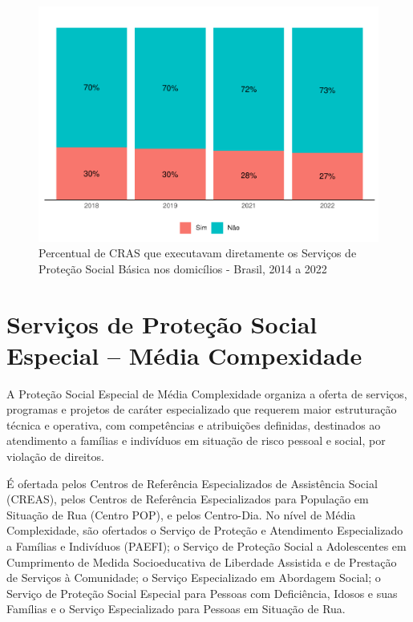 \documentclass[
  brazilian]{report}
\begin{document}
\begin{figure}
\includegraphics{Censo-SUAS-2022_files/figure-latex/CRAS-PSB-1} \caption[Percentual de CRAS que executavam diretamente os Serviços de Proteção Social Básica nos domicílios - Brasil, 2014 a 2022]{Percentual de CRAS que executavam diretamente os Serviços de Proteção Social Básica nos domicílios - Brasil, 2014 a 2022}\label{fig:CRAS-PSB}
\end{figure}

\hypertarget{serviuxe7os-de-proteuxe7uxe3o-social-especial-muxe9dia-compexidade}{%
\section{Serviços de Proteção Social Especial -- Média
Compexidade}\label{serviuxe7os-de-proteuxe7uxe3o-social-especial-muxe9dia-compexidade}}

A Proteção Social Especial de Média Complexidade organiza a oferta de
serviços, programas e projetos de caráter especializado que requerem
maior estruturação técnica e operativa, com competências e atribuições
definidas, destinados ao atendimento a famílias e indivíduos em situação
de risco pessoal e social, por violação de direitos.

É ofertada pelos Centros de Referência Especializados de Assistência
Social (CREAS), pelos Centros de Referência Especializados para
População em Situação de Rua (Centro POP), e pelos Centro-Dia. No nível
de Média Complexidade, são ofertados o Serviço de Proteção e Atendimento
Especializado a Famílias e Indivíduos (PAEFI); o Serviço de Proteção
Social a Adolescentes em Cumprimento de Medida Socioeducativa de
Liberdade Assistida e de Prestação de Serviços à Comunidade; o Serviço
Especializado em Abordagem Social; o Serviço de Proteção Social Especial
para Pessoas com Deficiência, Idosos e suas Famílias e o Serviço
Especializado para Pessoas em Situação de Rua.
\end{document}
